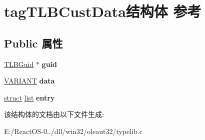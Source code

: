 \hypertarget{structtag_t_l_b_cust_data}{}\section{tag\+T\+L\+B\+Cust\+Data结构体 参考}
\label{structtag_t_l_b_cust_data}
\subsection*{Public 属性}
\begin{DoxyCompactItemize}
\item 
\mbox{\label{structtag_t_l_b_cust_data_af72fcf2e135359dabb4a7ae11da1d35b}} 
\hyperlink{structtag_t_l_b_guid}{T\+L\+B\+Guid} $\ast$ {\bfseries guid}
\item 
\mbox{\label{structtag_t_l_b_cust_data_a3a19e4dba31a0efb31f176fe7d26f0fa}} 
\hyperlink{structtag_v_a_r_i_a_n_t}{V\+A\+R\+I\+A\+NT} {\bfseries data}
\item 
\mbox{\label{structtag_t_l_b_cust_data_a9cba7be78f88e2c77c03ff0199b96d3d}} 
\hyperlink{interfacestruct}{struct} \hyperlink{classlist}{list} {\bfseries entry}
\end{DoxyCompactItemize}


该结构体的文档由以下文件生成\+:\begin{DoxyCompactItemize}
\item 
E\+:/\+React\+O\+S-\/0../dll/win32/oleaut32/typelib.\+c\end{DoxyCompactItemize}
